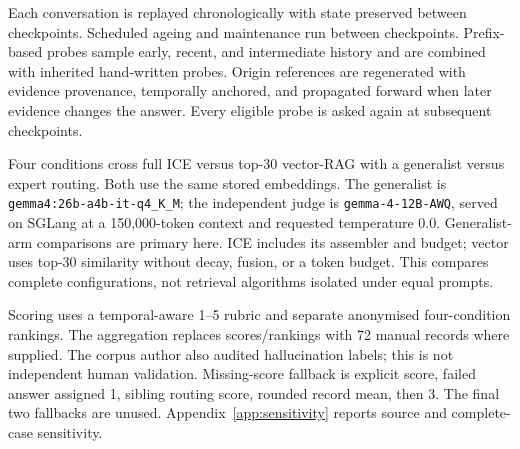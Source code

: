\documentclass[11pt]{article}
\begin{document}
\begin{table}[t]
\centering\small
{}
\caption{ICE v2 LSREP coverage and generalist-arm results. Scores are the historical 1--5 rubric; tokens estimate the complete supplied prompt. C is the density stress case. Observations repeat probes and are not independent tasks.}
\label{tab:four}
\end{table}

Each conversation is replayed chronologically with state preserved between checkpoints. Scheduled ageing and maintenance run between checkpoints. Prefix-based probes sample early, recent, and intermediate history and are combined with inherited hand-written probes. Origin references are regenerated with evidence provenance, temporally anchored, and propagated forward when later evidence changes the answer. Every eligible probe is asked again at subsequent checkpoints.

Four conditions cross full ICE versus top-30 vector-RAG with a generalist versus expert routing. Both use the same stored embeddings. The generalist is \texttt{gemma4:26b-a4b-it-q4\_K\_M}; the independent judge is \texttt{gemma-4-12B-AWQ}, served on SGLang at a 150,000-token context and requested temperature 0.0. Generalist-arm comparisons are primary here. ICE includes its assembler and budget; vector uses top-30 similarity without decay, fusion, or a token budget. This compares complete configurations, not retrieval algorithms isolated under equal prompts.

Scoring uses a temporal-aware 1--5 rubric and separate anonymised four-condition rankings. The aggregation replaces scores/rankings with 72 manual records where supplied. The corpus author also audited hallucination labels; this is not independent human validation. Missing-score fallback is explicit score, failed answer assigned 1, sibling routing score, rounded record mean, then 3. The final two fallbacks are unused. Appendix~\ref{app:sensitivity} reports source and complete-case sensitivity.
\end{document}
